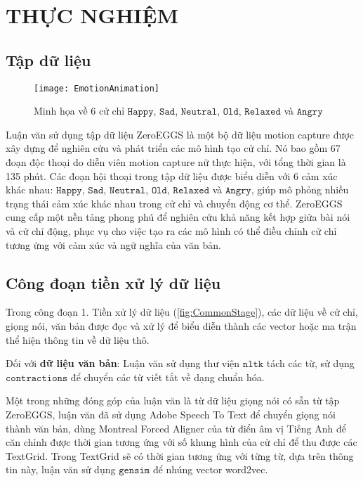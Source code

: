 \chapter{THỰC NGHIỆM}
\label{Chapter4}

\section{Tập dữ liệu}

\begin{figure}[H]
	\centering
	\texttt{[image: EmotionAnimation]}
	\caption{Minh họa về 6 cử chỉ $\texttt{Happy}$, $\texttt{Sad}$, $\texttt{Neutral}$, $\texttt{Old}$, $\texttt{Relaxed}$ và $\texttt{Angry}$}
\end{figure}

Luận văn sử dụng tập dữ liệu ZeroEGGS \cite{ghorbani2022zeroeggszeroshotexamplebasedgesture} là một bộ dữ liệu motion capture được xây dựng để nghiên cứu và phát triển các mô hình tạo cử chỉ. Nó bao gồm 67 đoạn độc thoại do diễn viên motion capture nữ thực hiện, với tổng thời gian là 135 phút. Các đoạn hội thoại trong tập dữ liệu được biểu diễn với 6 cảm xúc khác nhau: $\texttt{Happy}$, $\texttt{Sad}$, $\texttt{Neutral}$, $\texttt{Old}$, $\texttt{Relaxed}$ và $\texttt{Angry}$, giúp mô phỏng nhiều trạng thái cảm xúc khác nhau trong cử chỉ và chuyển động cơ thể. ZeroEGGS cung cấp một nền tảng phong phú để nghiên cứu khả năng kết hợp giữa bài nói và cử chỉ động, phục vụ cho việc tạo ra các mô hình có thể điều chỉnh cử chỉ tương ứng với cảm xúc và ngữ nghĩa của văn bản.

\section{Công đoạn tiền xử lý dữ liệu}
\label{sec:Preprocessing}

Trong công đoạn {1. Tiền xử lý dữ liệu} (\autoref{fig:CommonStage}), các dữ liệu về cử chỉ, giọng nói, văn bản được đọc và xử lý để biểu diễn thành các vector hoặc ma trận thể hiện thông tin về dữ liệu thô.

Đối với \textbf{dữ liệu văn bản}: Luận văn sử dụng thư viện $\texttt{nltk}$ tách các từ, sử dụng $\texttt{contractions}$ để chuyển các từ viết tắt về dạng chuẩn hóa.

Một trong những đóng góp của luận văn là từ dữ liệu giọng nói có sẵn từ tập ZeroEGGS, luận văn đã sử dụng Adobe Speech To Text để chuyển giọng nói thành văn bản, dùng Montreal Forced Aligner \cite{saxon2020robust} của từ điển âm vị Tiếng Anh để căn chỉnh được thời gian tương ứng với số khung hình của cử chỉ để thu được các TextGrid. Trong TextGrid sẽ có thời gian tương ứng với từng từ, dựa trên thông tin này, luận văn sử dụng  $\texttt{gensim}$ để nhúng vector word2vec.
 

